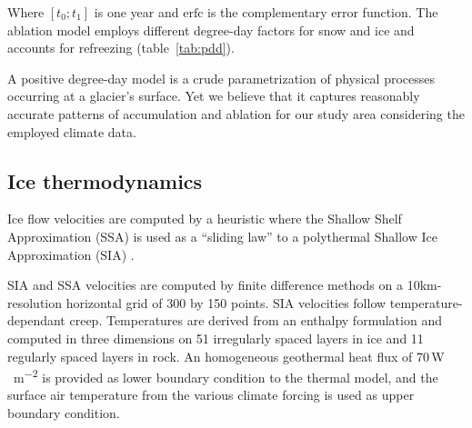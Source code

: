 Where $[t_0; t_1]$ is one year and $\mathrm{erfc}$ is the complementary error function. The ablation model employs different degree-day factors for snow and ice and accounts for refreezing (table~\ref{tab:pdd}).

A positive degree-day model is a crude parametrization of physical processes occurring at a glacier's surface. Yet we believe that it captures reasonably accurate patterns of accumulation and ablation for our study area considering the employed climate data.

\subsection{Ice thermodynamics}

Ice flow velocities are computed by a heuristic  where the Shallow Shelf Approximation (SSA) is used as a ``sliding law'' to a polythermal Shallow Ice Approximation (SIA) \citep{bueler-brown-2009}. 



SIA and SSA velocities are computed by finite difference methods on a 10km-resolution horizontal grid of 300 by 150 points. SIA velocities follow temperature-dependant creep. Temperatures are derived from an enthalpy formulation \citep{aschwanden-etal-2012} and computed in three dimensions on 51 irregularly spaced layers in ice and 11 regularly spaced layers in rock. An homogeneous geothermal heat flux of 70\,\unit{W\,m^{-2}} is provided as lower boundary condition to the thermal model, and the surface air temperature from the various climate forcing is used as upper boundary condition.

